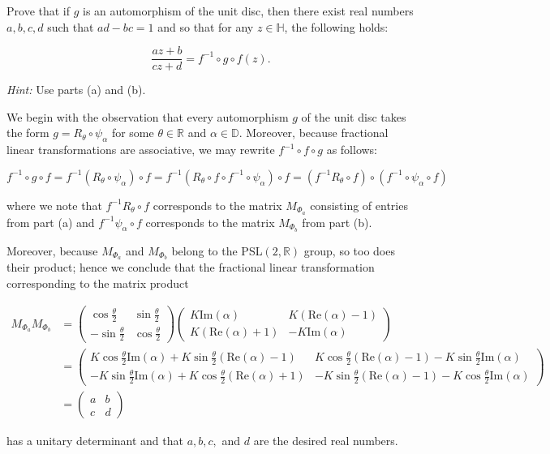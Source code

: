 Prove that if $g$ is an automorphism of the unit disc, then there exist real numbers $a, b, c, d$ such that 
$ad - bc = 1$ and so that for any $z \in \mathbb{H}$, the following holds:

$$
\frac{az + b}{cz + d} = f^{-1} \circ g \circ f(z).
$$

\textit{Hint: } Use parts (a) and (b).

\begin{solution}
  We begin with the observation that every automorphism $g$ of the unit disc takes the form 
  $g = R_{\theta} \circ \psi_{\alpha}$ for some $\theta \in \mathbb{R}$ and $\alpha \in \mathbb{D}$. Moreover, because
  fractional linear transformations are associative, we may rewrite $f^{-1} \circ f \circ g$ as follows:

  $$
  f^{-1} \circ g \circ f = f^{-1} \left(R_{\theta} \circ \psi_{\alpha}\right) \circ f
                         = f^{-1} \left(R_{\theta} \circ f \circ f^{-1} \circ \psi_{\alpha}\right) \circ f
                         = \left(f^{-1} R_{\theta} \circ f\right) \circ \left(f^{-1} \circ \psi_{\alpha} \circ f\right)
  $$

  where we note that $f^{-1} R_{\theta} \circ f$ corresponds to the matrix $M_{\Phi_a}$ consisting of entries from part 
  (a) and $f^{-1} \psi_{\alpha} \circ f$ corresponds to the matrix $M_{\Phi_b}$ from part (b).
  
  Moreover, because $M_{\Phi_a}$ and $M_{\Phi_b}$ belong to the PSL$(2, \mathbb{R})$ group, so too does their product; 
  hence we conclude that the fractional linear transformation corresponding to the matrix product

  \begin{align*}
    M_{\Phi_a} M_{\Phi_b} 
    &= \begin{pmatrix}
      \cos{\frac{\theta}{2}}  & \sin{\frac{\theta}{2}} \\
      -\sin{\frac{\theta}{2}} & \cos{\frac{\theta}{2}}
    \end{pmatrix} \begin{pmatrix}
      K \text{Im}(\alpha)      & K(\text{Re}(\alpha) - 1) \\
      K(\text{Re}(\alpha) + 1) & -K \text{Im}(\alpha)
    \end{pmatrix} \\
    &= \begin{pmatrix}
      K\cos{\frac{\theta}{2}} \text{Im}(\alpha) + K\sin{\frac{\theta}{2}}(\text{Re}(\alpha) - 1) 
      & K\cos{\frac{\theta}{2}}(\text{Re}(\alpha) - 1) - K\sin{\frac{\theta}{2}} \text{Im}(\alpha) \\
      -K\sin{\frac{\theta}{2}} \text{Im}(\alpha) + K\cos{\frac{\theta}{2}}(\text{Re}(\alpha) + 1)
      & -K\sin{\frac{\theta}{2}}(\text{Re}(\alpha) - 1) - K\cos{\frac{\theta}{2}} \text{Im}(\alpha)
    \end{pmatrix} \\
    &= \begin{pmatrix}
      a & b \\
      c & d
    \end{pmatrix}
  \end{align*}

  has a unitary determinant and that $a, b, c,$ and $d$ are the desired real numbers.
  \ \\
\end{solution}